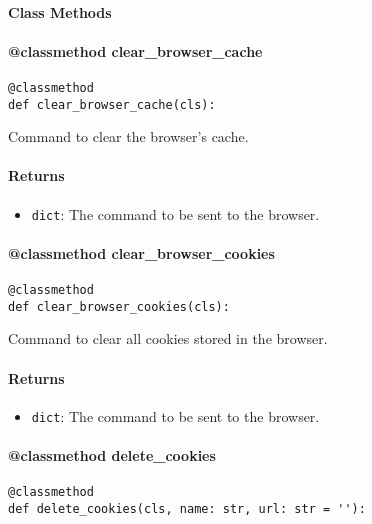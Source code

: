 \documentclass{article}
\begin{document}
\paragraph{Class Methods}
\paragraph{@classmethod clear\_browser\_cache}

\begin{lstlisting}[style=pythonstyle]
@classmethod
def clear_browser_cache(cls):
\end{lstlisting}

\noindent Command to clear the browser's cache.

\paragraph{Returns}

\begin{itemize}
    \item \lstinline[style=pythonstyle]|dict|: The command to be sent to the browser.
\end{itemize}

\paragraph{@classmethod clear\_browser\_cookies}

\begin{lstlisting}[style=pythonstyle]
@classmethod
def clear_browser_cookies(cls):
\end{lstlisting}

\noindent Command to clear all cookies stored in the browser.

\paragraph{Returns}

\begin{itemize}
    \item \lstinline[style=pythonstyle]|dict|: The command to be sent to the browser.
\end{itemize}

\paragraph{@classmethod delete\_cookies}

\begin{lstlisting}[style=pythonstyle]
@classmethod
def delete_cookies(cls, name: str, url: str = ''):
\end{lstlisting}
\end{document}
